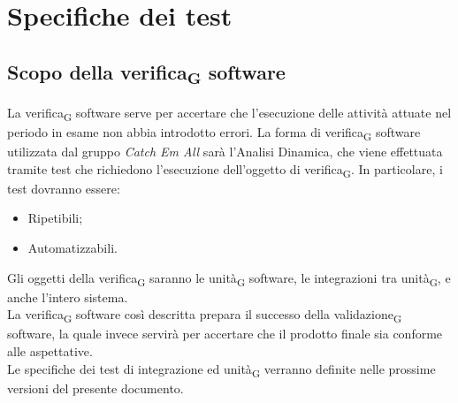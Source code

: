 \section{Specifiche dei test}

\subsection{Scopo della verifica\textsubscript{G} software}
La verifica\textsubscript{G} software serve per accertare che l'esecuzione delle attività attuate nel periodo in esame non abbia introdotto errori. La forma di verifica\textsubscript{G} software utilizzata dal gruppo \textit{Catch Em All} sarà l'Analisi Dinamica, che viene effettuata tramite test che richiedono l'esecuzione dell'oggetto di verifica\textsubscript{G}. In particolare, i test dovranno essere:
\begin{itemize}
	\item Ripetibili;
	\item Automatizzabili.
\end{itemize}
Gli oggetti della verifica\textsubscript{G} saranno le unità\textsubscript{G} software, le integrazioni tra unità\textsubscript{G}, e anche l'intero sistema.\\
La verifica\textsubscript{G} software così descritta prepara il successo della validazione\textsubscript{G} software, la quale invece servirà per accertare che il prodotto finale sia conforme alle aspettative.\\
Le specifiche dei test di integrazione ed unità\textsubscript{G} verranno definite nelle prossime versioni del presente documento.
